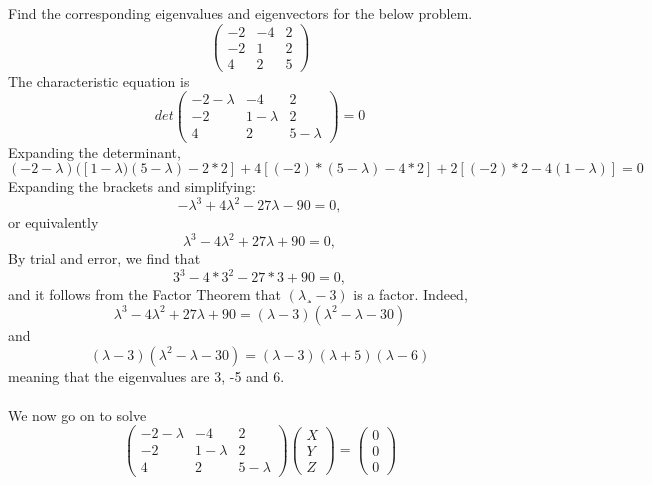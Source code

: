 \documentclass{book}
\begin{document}
Find the corresponding eigenvalues and eigenvectors for the below problem.
\begin{equation*}
	\begin{pmatrix}
	-2 & -4 & 2\\
	-2 & 1 & 2\\
	4 & 2 & 5
	\end{pmatrix}
\end{equation*}
The characteristic equation is
\begin{equation*}
det
	\begin{pmatrix}
	-2-\lambda & -4 & 2\\
	-2 & 1-\lambda & 2\\
	4 & 2 & 5-\lambda
	\end{pmatrix} = 0 
\end{equation*}
Expanding the determinant,
\begin{equation*}
	(-2-\lambda)([1-\lambda)(5-\lambda)-2 * 2] + 4 [(-2)*(5-\lambda) - 4 * 2] + 2[(-2) * 2 - 4(1-\lambda)] = 0
\end{equation*}
Expanding the brackets and simplifying:
\begin{equation*}
	-\lambda^3 + 4\lambda^2 - 27\lambda - 90 = 0,
\end{equation*}
or equivalently
\begin{equation*}
	\lambda^3 - 4\lambda^2 + 27\lambda + 90 = 0,
\end{equation*}
By trial and error, we find that
\begin{equation*}
	3^3 - 4 * 3^2 - 27 * 3 + 90 = 0,
\end{equation*}
and it follows from the Factor Theorem that $(\lambda¸-3)$  is a factor. Indeed,
\begin{equation*}
	\lambda^3 - 4\lambda^2 + 27\lambda + 90 = (\lambda - 3)(\lambda^2 - \lambda - 30)
\end{equation*}
and 
\begin{equation*}
	(\lambda - 3)(\lambda^2 - \lambda - 30) = (\lambda - 3)(\lambda + 5)(\lambda - 6)
\end{equation*}
meaning that the eigenvalues are 3, -5  and 6.\\
\\
We now go on to solve
\begin{equation*}
	\begin{pmatrix}
	-2-\lambda & -4 & 2\\
	-2 & 1-\lambda & 2\\
	4 & 2 & 5-\lambda
	\end{pmatrix}
	\begin{pmatrix}
	X\\
	Y\\
	Z
	\end{pmatrix}  = 
	\begin{pmatrix}
	0\\
	0\\
	0
	\end{pmatrix}
\end{equation*}
\end{document}
